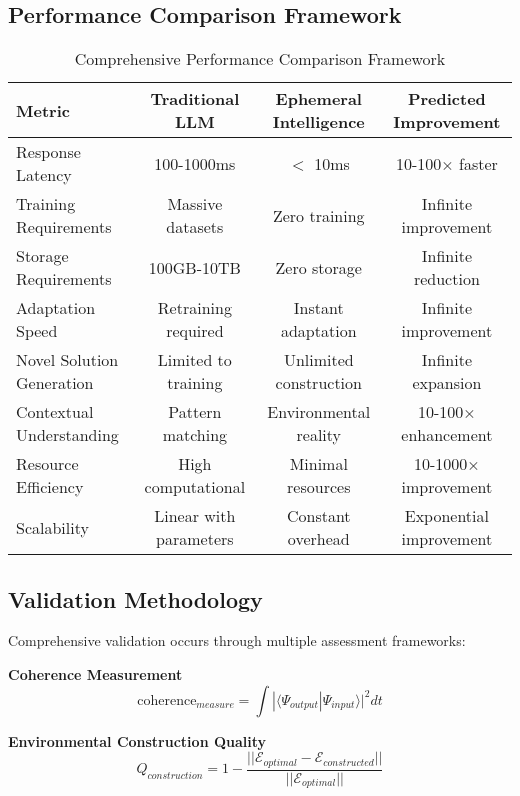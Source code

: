 \documentclass[12pt,a4paper]{article}
\begin{document}
\subsection{Performance Comparison Framework}

\begin{table}[htbp]
\centering
\caption{Comprehensive Performance Comparison Framework}
\begin{tabular}{lccc}
\toprule
\textbf{Metric} & \textbf{Traditional LLM} & \textbf{Ephemeral Intelligence} & \textbf{Predicted Improvement} \\
\midrule
Response Latency & 100-1000ms & $<$ 10ms & 10-100× faster \\
Training Requirements & Massive datasets & Zero training & Infinite improvement \\
Storage Requirements & 100GB-10TB & Zero storage & Infinite reduction \\
Adaptation Speed & Retraining required & Instant adaptation & Infinite improvement \\
Novel Solution Generation & Limited to training & Unlimited construction & Infinite expansion \\
Contextual Understanding & Pattern matching & Environmental reality & 10-100× enhancement \\
Resource Efficiency & High computational & Minimal resources & 10-1000× improvement \\
Scalability & Linear with parameters & Constant overhead & Exponential improvement \\
\bottomrule
\end{tabular}
\end{table}

\subsection{Validation Methodology}

Comprehensive validation occurs through multiple assessment frameworks:

\textbf{Coherence Measurement}
\begin{equation}
\text{coherence}_{measure} = \int |\langle\Psi_{output}|\Psi_{input}\rangle|^2 dt
\end{equation}

\textbf{Environmental Construction Quality}
\begin{equation}
Q_{construction} = 1 - \frac{||\mathcal{E}_{optimal} - \mathcal{E}_{constructed}||}{||\mathcal{E}_{optimal}||}
\end{equation}
\end{document}

